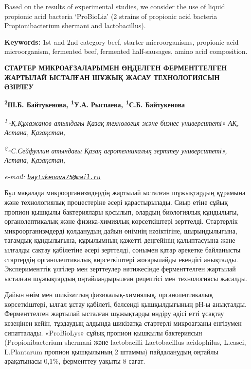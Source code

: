 Based on the results of experimental studies, we consider the use of
liquid propionic acid bacteria `ProBioLiz' (2 strains of propionic acid
bacteria Propionibacterium shermani and lactobacillus).

{\bfseries Keywords:} 1st and 2nd category beef, starter microorganisms,
propionic acid microorganism, fermented beef, fermented half-sausages,
amino acid composition.

\begin{articleheader}
{\bfseries СТАРТЕР МИКРОАҒЗАЛАРЫМЕН ӨҢДЕЛГЕН ФЕРМЕНТТЕЛГЕН ЖАРТЫЛАЙ
ЫСТАЛҒАН ШҰЖЫҚ ЖАСАУ ТЕХНОЛОГИЯСЫН ӘЗІРЛЕУ}

{\bfseries \textsuperscript{2}Ш.Б. Байтукенова\textsuperscript{\envelope },
\textsuperscript{1}У.А. Рыспаева, \textsuperscript{1}С.Б. Байтукенова}
\end{articleheader}

\begin{affiliation}
\emph{\textsuperscript{1}«Қ.Құлажанов атындағы Қазақ технология және
бизнес университеті» АҚ, Астана, Қазақстан,}

\emph{\textsuperscript{2}«С.Сейфуллин атындағы Қазақ агротехникалық
зерттеу университеті», Астана, Қазақстан,}

\emph{e-mail: \href{mailto:baytukenova75@mail.ru}{\nolinkurl{baytukenova75@mail.ru}}}
\end{affiliation}

Бұл мақалада микроорганизмдердің жартылай ысталған шұжықтардың құрамына
және технологиялық процестеріне әсері қарастырылады. Сиыр етіне сұйық
пропион қышқылы бактериялары қосылып, олардың биологиялық құндылығы,
органолептикалық және физика-химиялық көрсеткіштері зерттелді.
Стартерлік микроорганизмдерді қолданудың дайын өнімнің нәзіктігіне,
шырындылығына, тағамдық құндылығына, құрылымның қажетті деңгейінің
қалыптасуына және ылғалды сақтау қабілетіне әсері зерттелді, сонымен
қатар әрекетке байланысты стартердің органолептикалық көрсеткіштері
жоғарылайды екендігі анықталды. Эксперименттік үлгілер мен зерттеулер
нәтижесінде ферменттелген жартылай ысталған шұжықтардың оңтайландырылған
рецептісі мен технологиясы жасалды.

Дайын өнім мен шикізаттың физикалық-химиялық, органолептикалық
көрсеткіштері, ылғал ұстау қабілеті, белсенді қышқылдығының рН-ы
анықталды. Ферменттелген жартылай ысталған шұжықтарды өндіру әдісі етті
ұсақтау кезеңінен кейін, тұздаудың алдында шикізатқа стартерлі
микроағзаны енгізумен сипатталады. «ProBioLys» сұйық пропион қышқылы
бактериясын (Propionibacterium shermani және lactobacilli Lactobacillus
acidophilus, L.casei, L.Plantarum пропион қышқылының 2 штаммы)
пайдаланудың оңтайлы арақатынасы 0,1\%, ферменттеу уақыты 8 сағат.

